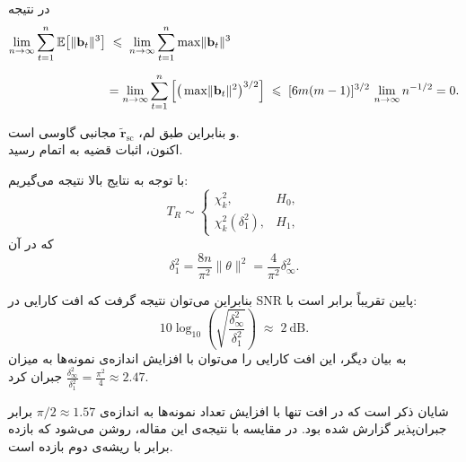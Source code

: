 \begin{اثبات}
	در نتیجه
	\begin{align}
		\lim_{n \to \infty} \sum_{t=1}^{n} 
		\mathbb{E}\!\left[ \lVert \mathbf{b}_{t} \rVert^{3} \right]
		&\;\le\;
		\lim_{n \to \infty} \sum_{t=1}^{n} \max \lVert \mathbf{b}_{t} \rVert^{3} \notag \\[6pt]
		&= \lim_{n \to \infty} \sum_{t=1}^{n} 
		\left[ \big(\max \lVert \mathbf{b}_{t} \rVert^{2}\big)^{3/2} \right]
		\;\le\; [6m(m-1)]^{3/2}\,\lim_{n \to \infty} n^{-1/2}
		= 0.
	\end{align}
	
	و بنابراین طبق لم، \(\tilde{\mathbf{r}}_{\mathrm{sc}}\) مجانبی گاوسی است.\\
	اکنون، اثبات قضیه به اتمام رسید.
	
\end{اثبات}
با توجه به نتایج بالا نتیجه می‌گیریم:
\begin{equation}
	T_{R}\sim
	\begin{cases}
		\chi^{2}_{k}, & H_{0},\\[6pt]
		\chi^{2}_{k}(\delta_{1}^{2}), & H_{1},
	\end{cases}
\end{equation}
که در آن
\begin{equation}
	\delta_{1}^{2}=\frac{8n}{\pi^{2}}\|\theta\|^{2}
	=\frac{4}{\pi^{2}}\delta_{\infty}^{2}.
\end{equation}

بنابراین می‌توان نتیجه گرفت که افت کارایی در SNR پایین تقریباً برابر است با:
\[
10\log_{10}\!\left(\sqrt{\frac{\delta_{\infty}^{2}}{\delta_{1}^{2}}}\right)\;\approx\;2~\mathrm{dB}.
\]
به بیان دیگر، این افت کارایی را می‌توان با افزایش اندازه‌ی نمونه‌ها به میزان
$
\frac{\delta_{\infty}^{2}}{\delta_{1}^{2}}
=\frac{\pi^{2}}{4}\approx 2.47
$
جبران کرد.  

شایان ذکر است که در  افت  تنها با افزایش تعداد نمونه‌ها به اندازه‌ی \linebreak
$\pi/2\approx 1.57$ 
برابر جبران‌پذیر گزارش شده بود.  
در مقایسه با نتیجه‌ی این مقاله، روشن می‌شود که بازده  برابر با ریشه‌ی دوم بازده  است.
